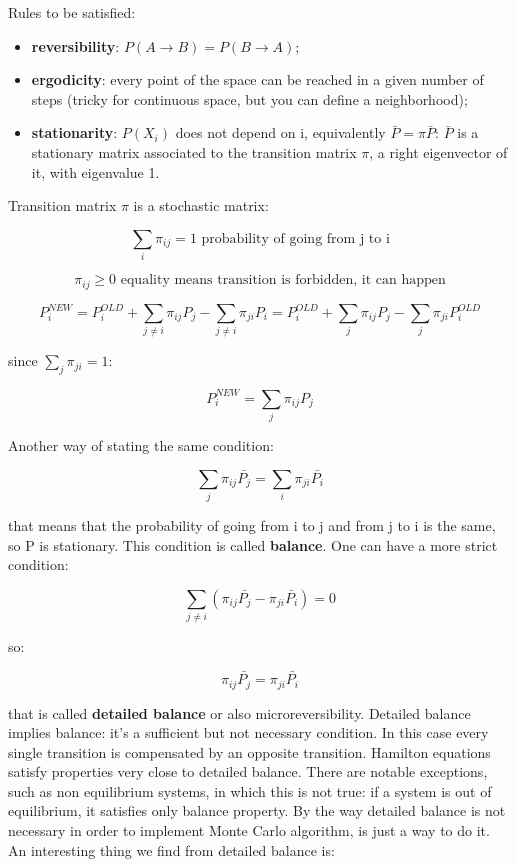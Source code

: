 \documentclass[a4paper, italian, openany]{book}
\begin{document}
Rules to be satisfied:

\begin{itemize}
\item \textbf{reversibility}: $P(A \rightarrow B) = P(B \rightarrow A)$;
\item \textbf{ergodicity}: every point of the space can be reached in a given number of steps (tricky for continuous space, but you can define a neighborhood);
\item \textbf{stationarity}: $P(X_i)$ does not depend on i, equivalently $\bar{P} = \pi \bar{P}$: $\bar{P}$ is a stationary matrix associated to the transition matrix $\pi$, a right eigenvector of it, with eigenvalue 1.
\end{itemize}

Transition matrix $\pi$ is a stochastic matrix:

$$\sum_i \pi_{ij} = 1 \mbox{ probability of going from j to i}$$

$$\pi_{ij} \ge 0 \mbox{ equality means transition is forbidden, it can happen}$$

$$P_i^{NEW} = P_i^{OLD} + \sum_{j \ne i} \pi_{ij}P_j - \sum_{j \ne i} \pi_{ji}P_i = P_i^{OLD} + \sum_j \pi_{ij}P_j - \sum_j \pi_{ji} P_i^{OLD}$$

since $\sum_j \pi_{ji} = 1$:

$$P_i^{NEW} = \sum_j \pi_{ij}P_j$$

Another way of stating the same condition:

$$\sum_j \pi_{ij} \bar{P_j} = \sum_i \pi_{ji} \bar{P_i}$$

that means that the probability of going from i to j and from j to i is the same, so P is stationary. This condition is called \textbf{balance}.\newline
One can have a more strict condition:

$$\sum_{j\ne i} \left ( \pi_{ij}\bar{P_j} - \pi_{ji}\bar{P_i} \right ) = 0$$

so:

$$\pi_{ij}\bar{P_j} = \pi_{ji}\bar{P_i}$$

that is called \textbf{detailed balance} or also microreversibility. Detailed balance implies balance: it's a sufficient but not necessary condition. In this case every single transition is compensated by an opposite transition.\newline
Hamilton equations satisfy properties very close to detailed balance. There are notable exceptions, such as non equilibrium systems, in which this is not true: if a system is out of equilibrium, it satisfies only balance property. By the way detailed balance is not necessary in order to implement Monte Carlo algorithm, is just a way to do it.\newline
An interesting thing we find from detailed balance is:
\end{document}
